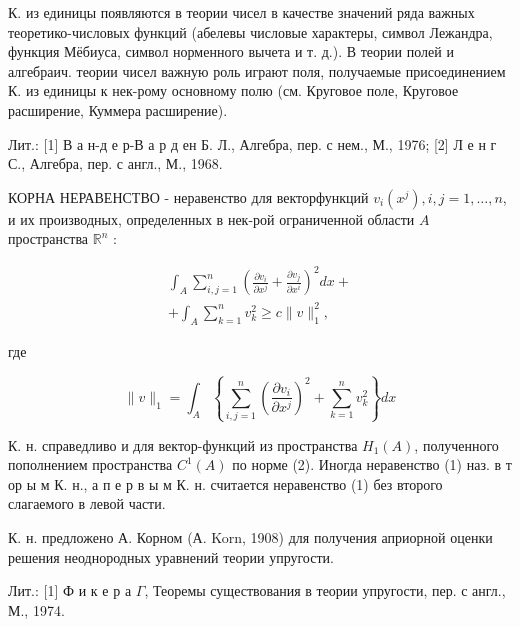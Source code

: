 \documentclass[10pt]{article}
\begin{document}
К. из единицы появляются в теории чисел в качестве значений ряда важных теоретико-числовых функций (абелевы числовые характеры, символ Лежандра, функция Мёбиуса, символ норменного вычета и т. д.). В теории полей и алгебраич. теории чисел важную роль играют поля, получаемые присоединением К. из единицы к нек-рому основному полю (см. Круговое поле, Круговое расширение, Куммера расширение).



Лит.: [1] В а н-д е р-В а р д ен Б. Л., Алгебра, пер. с нем., М., 1976; [2] Л е н г С., Алгебра, пер. с англ., М., 1968.



КОРНА НЕРАВЕНСТВО - неравенство для векторфункций $v_{i}\left(x^{j}\right), i, j=1, \ldots, n$, и их производных, определенных в нек-рой ограниченной области $A$ пространства $\mathbb{R}^{n}$ :



\[

\begin{gathered}

\int_{A} \sum_{i, j=1}^{n}\left(\frac{\partial v_{i}}{\partial x^{j}}+\frac{\partial v_{j}}{\partial x^{i}}\right)^{2} d x+ \\

+\int_{A} \sum_{k=1}^{n} v_{k}^{2} \geqslant c\|v\|_{1}^{2},

\end{gathered}

\]



где



\[

\|v\|_{1}=\int_{A}\left\{\sum_{i, j=1}^{n}\left(\frac{\partial v_{i}}{\partial x^{j}}\right)^{2}+\sum_{k=1}^{n} v_{k}^{2}\right\} d x

\]



К. н. справедливо и для вектор-функций из пространства $H_{1}(A)$, полученного пополнением пространства $C^{1}(A)$ по норме (2). Иногда неравенство (1) наз. в т ор ы м К. н., а п е р в ы м К. н. считается неравенство (1) без второго слагаемого в левой части.



К. н. предложено А. Корном (А. Korn, 1908) для получения априорной оценки решения неоднородных уравнений теории упругости.



Лит.: [1] Ф и к е р а $\Gamma$, Теоремы существования в теории упругости, пер. с англ., М., 1974.
\end{document}
